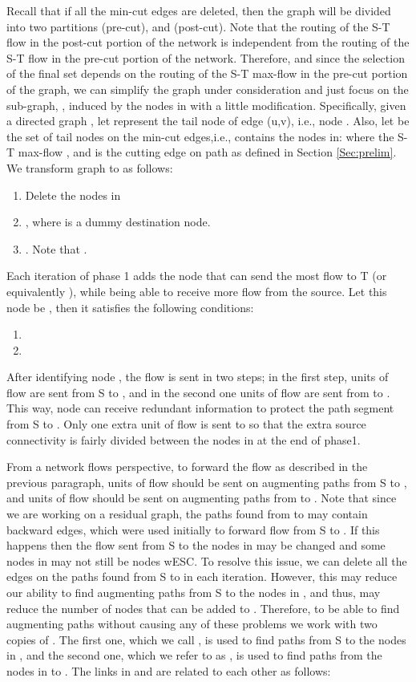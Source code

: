 \documentclass[conference]{IEEEtran}
\begin{document}
Recall that if all the min-cut edges are deleted, then the graph will be divided into two partitions  (pre-cut), and  (post-cut). Note that the routing of the S-T flow in the post-cut portion of the network is independent from the routing of the S-T flow in the pre-cut portion of the network. Therefore, and since the selection of the final set  depends on the routing of the S-T max-flow in the pre-cut portion of the graph, we can simplify the graph under consideration and just focus on the sub-graph, , induced by the nodes in  with a little modification. Specifically, given a directed graph , let  represent the tail node of edge (u,v), i.e., node . Also, let  be the set of tail nodes on the min-cut edges,i.e.,  contains the nodes in: where the S-T max-flow , and  is the cutting edge on path  as defined in Section \ref{Sec:prelim}. We transform graph  to  as follows:

\begin{enumerate}
\item Delete the nodes in 
\item , where  is a dummy destination node.
\item . Note that .
\end{enumerate}

Each iteration of phase 1 adds the node that can send the most flow to T (or equivalently ), while being able to receive more flow from the source. Let this node be , then it satisfies the following conditions:

\begin{enumerate}
\item 
\item 
\end{enumerate}

After identifying node , the flow is sent in two steps; in the first step,  units of flow are sent from S to , and in the second one  units of flow are sent from  to . This way, node  can receive redundant information to protect the  path segment from S to . Only one extra unit of flow is sent to  so that the extra source connectivity is fairly divided between the nodes in  at the end of phase1. 

From a network flows perspective, to forward the flow as described in the previous paragraph,  units of flow should be sent on  augmenting paths from S to , and  units of flow should be sent on  augmenting paths from  to . Note that since we are working on a residual graph, the paths found from  to  may contain backward edges, which were used initially to forward flow from S to . If this happens then the flow sent from S to the nodes in  may be changed and some nodes in  may not still be nodes wESC. To resolve this issue, we can delete all the edges on the paths found from S to  in each iteration. However, this may reduce our ability to find augmenting paths from S to the nodes in , and thus, may reduce the number of nodes that can be added to . Therefore, to be able to find augmenting paths without causing any of these problems we work with two copies of . The first one, which we call , is used to find paths from S to the nodes in , and the second one, which we refer to as , is used to find paths from the nodes in  to . The links in  and  are related to each other as follows:
\end{document}
